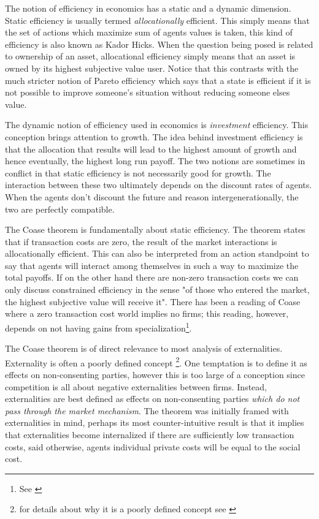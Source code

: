 \documentclass[12pt]{report}
\numberwithin{equation}{section}
\begin{document}


The notion of efficiency in economics has a static and a dynamic dimension. Static efficiency is usually termed \textit{allocationally} efficient. This simply means that the set of actions which maximize sum of agents values is taken, this kind of efficiency is also known as Kador Hicks. When the question being posed is related to ownership of an asset, allocational efficiency simply means that an asset is owned by its highest subjective value user. Notice that this contrasts with the much stricter notion of Pareto efficiency which says that a state is efficient if it is not possible to improve someone's situation without reducing someone elses value. 

The dynamic notion of efficiency used in economics is \textit{investment} efficiency. This conception brings attention to growth. The idea behind investment efficiency is that the allocation that results will lead to the highest amount of growth and hence eventually, the highest long run payoff. The two notions are sometimes in conflict in that static efficiency is not necessarily good for growth. The interaction between these two ultimately depends on the discount rates of agents. When the agents don't discount the future and reason intergenerationally, the two are perfectly compatible.

The Coase theorem is fundamentally about static efficiency. The theorem states that if transaction costs are zero, the result of the market interactions is allocationally efficient. This can also be interpreted from an action standpoint to say that agents will interact among themselves in such a way to maximize the total payoffs. If on the other hand there are non-zero transaction costs we can only discuss constrained efficiency in the sense "of those who entered the market, the highest subjective value will receive it". There has been a reading of Coase where a zero transaction cost world implies no firms; this reading, however, depends on not having gains from specialization\footnote{See \cite{demsetz2011rh}}.

The Coase theorem is of direct relevance to most analysis of externalities. Externality is often a poorly defined concept \footnote{for details about why it is a poorly defined concept see \cite{Cheung1970}}. One temptation is to define it as effects on non-consenting parties, however this is too large of a conception since competition is all about negative externalities between firms. Instead, externalities are best defined as effects on non-consenting parties \textit{which do not pass through the market mechanism}. The theorem was initially framed with externalities in mind, perhaps its most counter-intuitive result is that it implies that externalities become internalized if there are sufficiently low transaction costs, said otherwise, agents individual private costs will be equal to the social cost.
\end{document}

